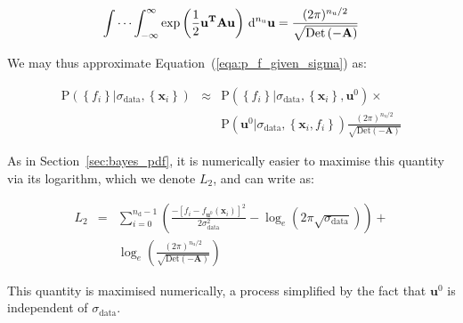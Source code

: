 \begin{equation}
\idotsint_{-\infty}^{\infty}
\exp \left(
\frac{1}{2}\mathbf{u}^\mathbf{T} \mathbf{A} \mathbf{u}
\right) \,\mathrm{d}^{n_\mathrm{u}}\mathbf{u}
=
\frac{
(2\pi)^{n_\mathrm{u}/2}
}{
\sqrt{\mathrm{Det}\left(-\mathbf{A}\right)}
}
\end{equation}

\noindent We may thus approximate Equation~(\ref{eqa:p_f_given_sigma}) as:

\begin{eqnarray}
\mathrm{P}\left( \left\{ f_i \right\} | \sigma_\mathrm{data}, \left\{ \mathbf{x}_i \right\} \right)
& \approx &
\mathrm{P}\left( \left\{ f_i \right\} | \sigma_\mathrm{data}, \left\{ \mathbf{x}_i \right\}, \mathbf{u}^0 \right)
\times \\
& &
\mathrm{P}\left( \mathbf{u}^0 | \sigma_\mathrm{data}, \left\{ \mathbf{x}_i, f_i \right\} \right)
\frac{
(2\pi)^{n_\mathrm{u}/2}
}{
\sqrt{\mathrm{Det}\left(-\mathbf{A}\right)}
}
\nonumber
\end{eqnarray}

As in Section~\ref{sec:bayes_pdf}, it is numerically easier to maximise this
quantity via its logarithm, which we denote $L_2$, and can write as:

\begin{eqnarray}
L_2 & = &
\sum_{i=0}^{n_\mathrm{d}-1}
\left(
\frac{
-\left[f_i - f_{\mathbf{u}^0}(\mathbf{x}_i)\right]^2
}{
2\sigma_\mathrm{data}^2
}
- \log_e \left(2\pi\sqrt{\sigma_\mathrm{data}} \right)
\right) +
\\ & & \nonumber
\log_e \left(
\frac{
(2\pi)^{n_\mathrm{u}/2}
}{
\sqrt{\mathrm{Det}\left(-\mathbf{A}\right)}
}
\right)
\end{eqnarray}

This quantity is maximised numerically, a process simplified by the fact that
$\mathbf{u}^0$ is independent of $\sigma_\mathrm{data}$.
